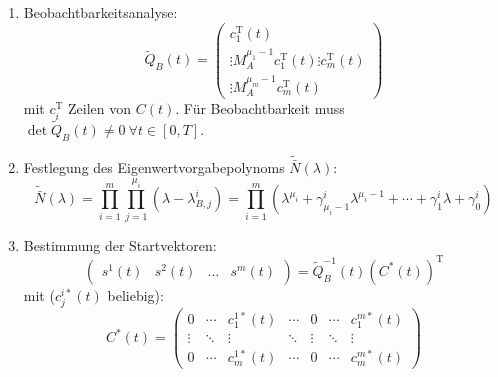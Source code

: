 \begin{enumerate}
    \item
        Beobachtbarkeitsanalyse:
        \begin{equation}
            \tilde{Q}_B (t) =
                \begin{pmatrix}
                    c_1^\text{T}(t) \\
                    \vdots
                    M_A^{\mu_1 -1} c_1^\text{T}(t)
                    \vdots
                    c_m^\text{T}(t) \\
                    \vdots
                    M_A^{\mu_m -1} c_m^\text{T}(t)
                \end{pmatrix}
        \end{equation}
        mit $c_i^\text{T}$ Zeilen von $C(t)$. 
        Für Beobachtbarkeit muss $\det \tilde{Q}_B (t) \neq 0\ \forall t \in [0, T]$.
    \item
        Festlegung des Eigenwertvorgabepolynoms $\tilde{\bar{N}}(\lambda)$:
        \begin{equation}
            \tilde{\bar{N}}(\lambda) = \prod_{i=1}^m \prod_{j=1}^{\mu_i}
            (\lambda - \lambda^i_{B,j}) =
            \prod_{i=1}^m (\lambda^{\mu_i} + \gamma_{\mu_i -1}^i \lambda^{\mu_i-1}
            + \cdots + \gamma_1^i \lambda + \gamma_0^i)
        \end{equation}
    \item
        Bestimmung der Startvektoren:
        \begin{equation}
            \begin{pmatrix}
                s^1(t)& s^2(t)& \ldots& s^m(t)
            \end{pmatrix} =
            \tilde{Q}_B^{-1} (t) {(C^*(t))}^\text{T}
        \end{equation} 
        mit ($c_j^{i*}(t)$ beliebig):
        \begin{equation}
            C^*(t) = \begin{pmatrix}
                0 & \cdots & c_1^{1*}(t) & \cdots & 0 & \cdots & c_1^{m*}(t) \\
                \vdots & \ddots & \vdots & \ddots & \vdots & \ddots & \vdots \\
                0 & \cdots & c_m^{1*}(t) & \cdots & 0 & \cdots & c_m^{m*}(t)
            \end{pmatrix}
        \end{equation}


\end{enumerate}
